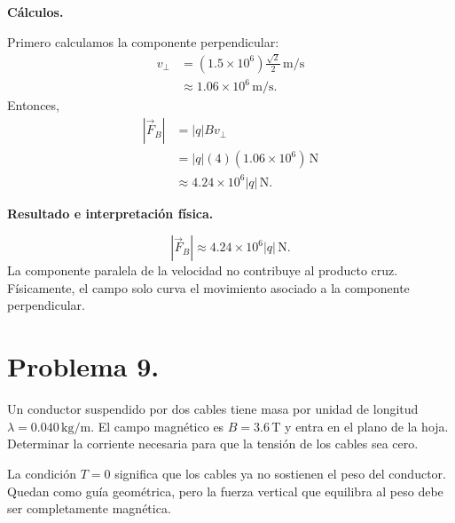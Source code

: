 \documentclass[11pt]{article}
\begin{document}
\par\medskip\noindent\textbf{Cálculos.}\par\smallskip
Primero calculamos la componente perpendicular:
\begin{align*}
    v_\perp
    &=(1.5\times10^6)\frac{\sqrt2}{2}\,\mathrm{m/s}\\
    &\approx1.06\times10^6\,\mathrm{m/s}.
\end{align*}
Entonces,
\begin{align*}
    |\vec F_B|
    &=|q|Bv_\perp\\
    &=|q|(4)(1.06\times10^6)\,\mathrm N\\
    &\approx4.24\times10^6|q|\,\mathrm N.
\end{align*}

\par\medskip\noindent\textbf{Resultado e interpretación física.}\par\smallskip
\begin{equation*}
    \boxed{|\vec F_B|\approx4.24\times10^6|q|\,\mathrm N}.
\end{equation*}
La componente paralela de la velocidad no contribuye al producto cruz. F\'isicamente, el campo solo curva el movimiento asociado a la componente perpendicular.

\newpage

\section*{Problema 9.}
Un conductor suspendido por dos cables tiene masa por unidad de longitud $\lambda=0.040\,\mathrm{kg/m}$. El campo magn\'etico es $B=3.6\,\mathrm T$ y entra en el plano de la hoja. Determinar la corriente necesaria para que la tensi\'on de los cables sea cero.

\par\medskip\noindent La condici\'on $T=0$ significa que los cables ya no sostienen el peso del conductor. Quedan como gu\'ia geom\'etrica, pero la fuerza vertical que equilibra al peso debe ser completamente magn\'etica.\par\medskip 
\end{document}
